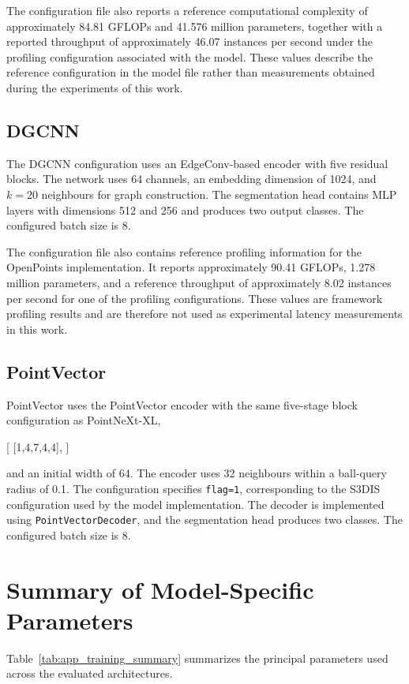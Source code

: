 The configuration file also reports a reference computational complexity of approximately 84.81 GFLOPs and 41.576 million parameters, together with a reported throughput of approximately 46.07 instances per second under the profiling configuration associated with the model. These values describe the reference configuration in the model file rather than measurements obtained during the experiments of this work.

\subsection{DGCNN}

The DGCNN configuration uses an EdgeConv-based encoder with five residual blocks. The network uses 64 channels, an embedding dimension of 1024, and $k=20$ neighbours for graph construction. The segmentation head contains MLP layers with dimensions 512 and 256 and produces two output classes. The configured batch size is 8.

The configuration file also contains reference profiling information for the OpenPoints implementation. It reports approximately 90.41 GFLOPs, 1.278 million parameters, and a reference throughput of approximately 8.02 instances per second for one of the profiling configurations. These values are framework profiling results and are therefore not used as experimental latency measurements in this work.

\subsection{PointVector}

PointVector uses the PointVector encoder with the same five-stage block configuration as PointNeXt-XL,

[
[1,4,7,4,4],
]

and an initial width of 64. The encoder uses 32 neighbours within a ball-query radius of 0.1. The configuration specifies \texttt{flag=1}, corresponding to the S3DIS configuration used by the model implementation. The decoder is implemented using \texttt{PointVectorDecoder}, and the segmentation head produces two classes. The configured batch size is 8.

\section{Summary of Model-Specific Parameters}
\label{app:training_summary}

Table~\ref{tab:app_training_summary} summarizes the principal parameters used across the evaluated architectures.

